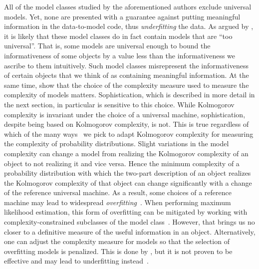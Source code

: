 All of the model classes studied by the aforementioned authors exclude universal models.
Yet, none are presented with a guarantee against putting meaningful information in the data-to-model code, thus \emph{underfitting} the data.
As argued by \textcite{bloem2015two}, it is likely that these model classes do in fact contain models that are \enquote{too universal}.
That is, some models are universal enough to bound the informativeness of some objects by a value less than the informativeness we ascribe to them intuitively.
Such model classes misrepresent the informativeness of certain objects that we think of as containing meaningful information.
At the same time, \textcite{vereshchagin2009algorithmic,bloem2015two,antunes2017sophistication} show that the choice of the complexity measure used to measure the complexity of models matters.
Sophistication, which is described in more detail in the next section, in particular is sensitive to this choice.
While Kolmogorov complexity is invariant under the choice of a universal machine, sophistication, despite being based on Kolmogorov complexity, is not.
This is true regardless of which of the many ways~\parencite{gacs2001algorithmic} we pick to adapt Kolmogorov complexity for measuring the complexity of probability distributions.
Slight variations in the model complexity can change a model from realizing the Kolmogorov complexity of an object to not realizing it and vice versa.
Hence the minimum complexity of a probability distribution with which the two-part description of an object realizes the Kolmogorov complexity of that object can change significantly with a change of the reference universal machine.
As a result, some choices of a reference machine may lead to widespread \emph{overfitting}~\parencite{bloem2015two}.
When performing maximum likelihood estimation, this form of overfitting can be mitigated by working with complexity-constrained subclasses of the model class~\parencite{vereshchagin2004kolmogorov}.
However, that brings us no closer to a definitive measure of the useful information in an object.
Alternatively, one can adjust the complexity measure for models so that the selection of overfitting models is penalized.
This is done by \textcite{rissanen1983universal,antunes2009sophistication}, but it is not proven to be effective and may lead to underfitting instead~\parencite{bloem2015two}.

